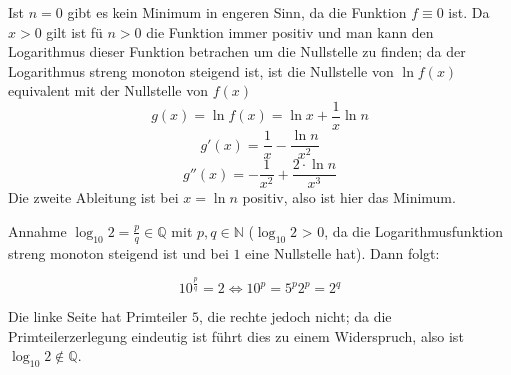 \begin{flushenum}
	Ist $n = 0$ gibt es kein Minimum in engeren Sinn, da die Funktion $f \equiv 0$ ist.
	Da $x > 0$ gilt ist fü $n>0$ die Funktion immer positiv und man kann den Logarithmus dieser Funktion betrachen um die Nullstelle zu finden;
	da der Logarithmus streng monoton steigend ist, ist die Nullstelle von $\ln f(x)$ equivalent mit der Nullstelle von $f(x)$
	\[ g(x) = \ln f(x) = \ln x + \frac{1}{x} \ln n \]
	\[ g'(x) = \frac{1}{x} - \frac{\ln n}{x^2} \]
	\[ g''(x) = -\frac{1}{x^2} + \frac{2 \cdot \ln n}{x^3} \]
	Die zweite Ableitung ist bei $x = \ln n$ positiv, also ist hier das Minimum.
\item Annahme $\log_{10} 2 = \frac{p}{q} \in \mathbb{Q}$ mit $p,q \in
\mathbb{N}$ ($\log_{10} 2$ > 0, da die Logarithmusfunktion streng monoton
steigend ist und bei $1$ eine Nullstelle hat). Dann folgt:

\[ 10^{\frac{p}{q}} = 2 \Leftrightarrow 10^p = 5^p 2^p = 2^q \]

Die linke Seite hat Primteiler $5$, die rechte jedoch nicht; da die
Primteilerzerlegung eindeutig ist führt dies zu einem Widerspruch, also ist
$\log_{10} 2 \not\in \mathbb{Q}$.
\end{flushenum}

